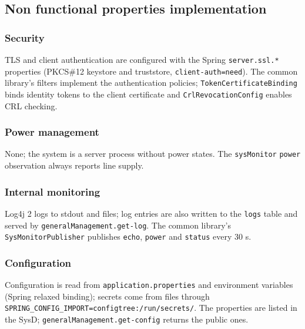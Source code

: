 \documentclass[a4paper]{arrowhead}
\begin{document}
\subsection{Non functional properties implementation}

\subsubsection{Security}

TLS and client authentication are configured with the Spring \texttt{server.\allowbreak{}ssl.\allowbreak{}*} properties (PKCS\#12 keystore and truststore, \texttt{client-\allowbreak{}auth=\allowbreak{}need}). The common library's filters implement the authentication policies; \texttt{Token\allowbreak{}Certificate\allowbreak{}Binding} binds identity tokens to the client certificate and \texttt{Crl\allowbreak{}Revocation\allowbreak{}Config} enables CRL checking.

\subsubsection{Power management}

None; the system is a server process without power states. The \texttt{sysMonitor} \texttt{power} observation always reports line supply.

\subsubsection{Internal monitoring}

Log4j 2 logs to stdout and files; log entries are also written to the \texttt{logs} table and served by \texttt{general\allowbreak{}Management.\allowbreak{}get-\allowbreak{}log}. The common library's \texttt{Sys\allowbreak{}Monitor\allowbreak{}Publisher} publishes \texttt{echo}, \texttt{power} and \texttt{status} every 30 s.

\subsubsection{Configuration}

Configuration is read from \texttt{application.\allowbreak{}properties} and environment variables (Spring relaxed binding); secrets come from files through \texttt{SPRING\_\allowbreak{}CONFIG\_\allowbreak{}IMPORT=\allowbreak{}configtree:\allowbreak{}/\allowbreak{}run/\allowbreak{}secrets/\allowbreak{}}. The properties are listed in the SysD; \texttt{general\allowbreak{}Management.\allowbreak{}get-\allowbreak{}config} returns the public ones.
\end{document}
